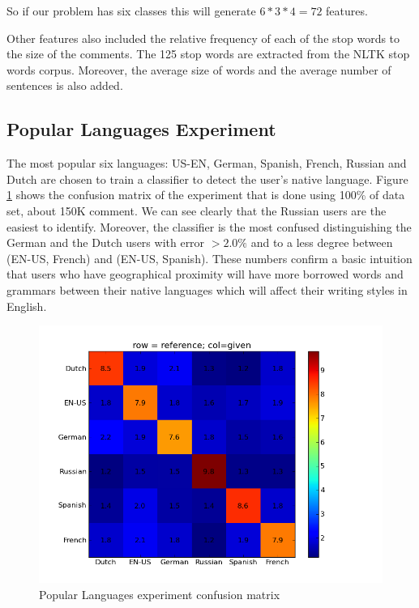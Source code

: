 \documentclass[11pt]{article}
\begin{document}
So if our problem has six classes this will generate $6*3*4 = 72$ features.

Other features also included the relative frequency of each of the stop words to the size of the comments. The  125 stop words are extracted from the NLTK stop words corpus. Moreover, the average size of words and the average number  of sentences is also added.

\subsection{Popular Languages Experiment}
The most popular six languages: US-EN, German, Spanish, French, Russian and Dutch  are chosen to train a classifier to detect the user's native language. Figure \ref{pop_cfm} shows the confusion matrix of the experiment that is done using 100\% of data set, about 150K comment. We can see clearly that the Russian users are the easiest to identify. Moreover, the classifier is the most confused distinguishing the German and the Dutch users with error $>2.0\%$ and to a less degree between (EN-US, French) and (EN-US, Spanish). These numbers confirm a basic intuition that users who have geographical proximity will have more borrowed words and grammars between their native languages which will affect their writing styles in English.




\begin{figure}[htp]
\centering
\includegraphics[scale=0.45]{popular_cfm.png}
\caption{Popular Languages experiment confusion matrix}
\label{pop_cfm}
\end{figure}
\end{document}
